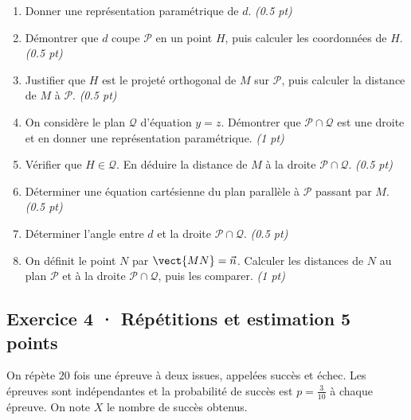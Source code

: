 \begin{enumerate}

\item Donner une représentation paramétrique de $d$. \hfill\textit{(\num{0,5} pt)}

\item Démontrer que $d$ coupe $\mathcal P$ en un point $H$, puis calculer les coordonnées de $H$. \hfill\textit{(\num{0,5} pt)}

\item Justifier que $H$ est le projeté orthogonal de $M$ sur $\mathcal P$, puis calculer la distance de $M$ à $\mathcal P$. \hfill\textit{(\num{0,5} pt)}

\item On considère le plan $\mathcal Q$ d'équation $y=z$. Démontrer que $\mathcal P\cap\mathcal Q$ est une droite et en donner une représentation paramétrique. \hfill\textit{(1 pt)}

\item Vérifier que $H\in\mathcal Q$. En déduire la distance de $M$ à la droite $\mathcal P\cap\mathcal Q$. \hfill\textit{(\num{0,5} pt)}

\item Déterminer une équation cartésienne du plan parallèle à $\mathcal P$ passant par $M$. \hfill\textit{(\num{0,5} pt)}

\item Déterminer l'angle entre $d$ et la droite $\mathcal P\cap\mathcal Q$. \hfill\textit{(\num{0,5} pt)}

\item On définit le point $N$ par $\vect{MN}=\vec n$. Calculer les distances de $N$ au plan $\mathcal P$ et à la droite $\mathcal P\cap\mathcal Q$, puis les comparer. \hfill\textit{(1 pt)}

\end{enumerate}

\subsection*{Exercice 4 · Répétitions et estimation \hfill 5 points}On répète $20$ fois une épreuve à deux issues, appelées succès et échec. Les épreuves sont indépendantes et la probabilité de succès est $p=\frac{3}{10}$ à chaque épreuve. On note $X$ le nombre de succès obtenus.

